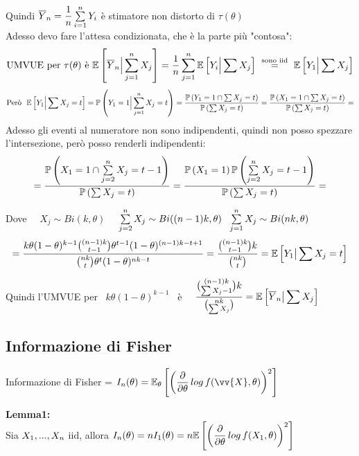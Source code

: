 Quindi $\overline{Y}_n =\dfrac1n \sum\limits_{i=1}^{n} Y_i$ è stimatore non distorto di $\tau(\theta)$\\

Adesso devo fare l'attesa condizionata, che è la parte più "contosa":
\[
\text{UMVUE per } \tau(\theta) \text{ è } \mathbb{E} \left[ \overline{Y}_n \Big| \sum\limits_{j=1}^{n}X_j \right]  = \dfrac{1}{n} \sum\limits_{j=1}^{n} \mathbb{E} \left[ Y_i \Big| \sum X_j  \right] \ \overset{\text{sono iid}}{ = } \ \mathbb{E} \left[ Y_1 \Big| \sum X_j  \right]
\]
\[
\text{Però \ } \mathbb{E} \left[ Y_1 \Big| \sum X_j = t  \right] = \mathbb{P} \left( Y_1=1 \Big| \sum\limits_{j=1}^{n} X_j =t  \right) = \dfrac{\mathbb{P} \left( Y_1=1 \cap \sum X_j =t \right)}{\mathbb{P} \left( \sum X_j=t \right)} = \dfrac{\mathbb{P} \left( X_1=1 \cap \sum X_j =t \right)}{\mathbb{P} \left( \sum X_j=t \right)}= 
\]
Adesso gli eventi al numeratore non sono indipendenti, quindi non posso spezzare l'intersezione, però posso renderli indipendenti:
\[
=\dfrac{\mathbb{P} \left( X_1=1 \cap \sum\limits_{j=2}^{n} X_j =t -1  \right)}{\mathbb{P} \left( \sum X_j=t \right)} = \dfrac{\mathbb{P} \left( X_1=1  \right) \mathbb{P} \left(  \sum\limits_{j=2}^{n} X_j =t -1  \right)}{\mathbb{P} \left( \sum X_j=t \right)}=
\]

Dove \ \ $X_j \sim Bi(k,\theta)$ \ \ $ \Sum{j=2}{n} X_j \sim Bi((n-1)k,\theta)  \ \ \Sum{j=1}{n} X_j \sim Bi(nk,\theta) $
\[
=\dfrac{k\theta (1-\theta)^{k-1} \binom{(n-1)k}{t-1} \theta^{t-1}(1-\theta)^{(n-1)k -t +1} }{\binom{nk}{t} \theta^t (1-\theta)^{nk-t}} = \dfrac{\binom{(n-1)k}{t-1} k }{\binom{nk}{t}  } = \mathbb{E} \left[ Y_1 \big| \sum X_j =t \right]
\]

Quindi l'UMVUE per \  $k\theta(1-\theta)^{k-1}$ \  è \  \ $\displaystyle \dfrac{\binom{(n-1)k}{ \sum X_j -1 } k }{\binom{nk}{\sum X_j}  } = \mathbb{E} \left[ \overline{Y}_n \big| \sum X_j  \right] $\\



\subsection{Informazione di Fisher}

\begin{defi}
    Informazione di Fisher = $I_n(\theta)=\EE_{\theta}\OO\O\frac{\partial}{\partial\theta}\,log\,f(\vv{X},\theta)\C^2\CC$
\end{defi}

\textbf{Lemma1:}\\
Sia $X_1,...,X_n$ iid, allora $I_n(\theta)=nI_1(\theta)=n \mathbb{E} \left[ \left(\dfrac{\partial}{\partial\theta} \,log \,f(X_1,\theta)\right)^2 \right]$\\

